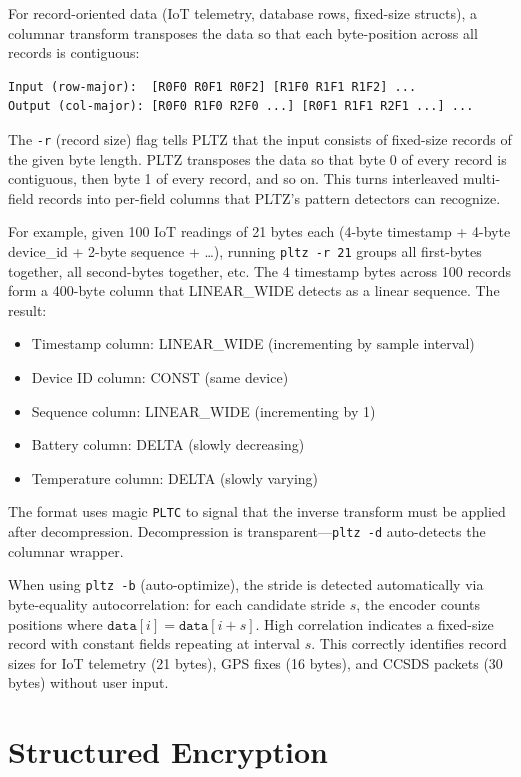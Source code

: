 \documentclass[11pt,a4paper]{article}
\begin{document}
For record-oriented data (IoT telemetry, database rows, fixed-size structs), a columnar transform transposes the data so that each byte-position across all records is contiguous:

\begin{lstlisting}
Input (row-major):  [R0F0 R0F1 R0F2] [R1F0 R1F1 R1F2] ...
Output (col-major): [R0F0 R1F0 R2F0 ...] [R0F1 R1F1 R2F1 ...] ...
\end{lstlisting}

The \texttt{-r} (record size) flag tells PLTZ that the input consists of fixed-size records of the given byte length. PLTZ transposes the data so that byte 0 of every record is contiguous, then byte 1 of every record, and so on. This turns interleaved multi-field records into per-field columns that PLTZ's pattern detectors can recognize.

For example, given 100 IoT readings of 21 bytes each (4-byte timestamp + 4-byte device\_id + 2-byte sequence + \ldots), running \texttt{pltz -r 21} groups all first-bytes together, all second-bytes together, etc. The 4 timestamp bytes across 100 records form a 400-byte column that LINEAR\_WIDE detects as a linear sequence. The result:
\begin{itemize}
\item Timestamp column: LINEAR\_WIDE (incrementing by sample interval)
\item Device ID column: CONST (same device)
\item Sequence column: LINEAR\_WIDE (incrementing by 1)
\item Battery column: DELTA (slowly decreasing)
\item Temperature column: DELTA (slowly varying)
\end{itemize}

The format uses magic \texttt{PLTC} to signal that the inverse transform must be applied after decompression. Decompression is transparent---\texttt{pltz -d} auto-detects the columnar wrapper.

When using \texttt{pltz -b} (auto-optimize), the stride is detected automatically via byte-equality autocorrelation: for each candidate stride $s$, the encoder counts positions where $\texttt{data}[i] = \texttt{data}[i+s]$. High correlation indicates a fixed-size record with constant fields repeating at interval $s$. This correctly identifies record sizes for IoT telemetry (21 bytes), GPS fixes (16 bytes), and CCSDS packets (30 bytes) without user input.

\section{Structured Encryption}
\end{document}

